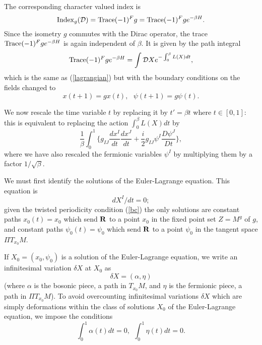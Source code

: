 \documentclass[12pt]{article}
\newcommand{\labell}[1] {\label{#1}}
\begin{document}
The corresponding character valued index is
\begin{equation} \labell{diracg}
{\rm Index}_g (\dbar) = {\rm Trace}  (-1)^Fg  = 
{\rm Trace } (-1)^Fg e^{- \beta H}.
\end{equation}
Since the isometry $g$ commutes with the Dirac operator, the trace 
${\rm Trace } (-1)^Fg e^{- \beta H}$ is again independent of $\beta$.
It  is given by  the path integral 
\begin{equation} \labell{lagrangiang}
{\rm Trace } (-1)^F g e^{- \beta H} = \int \cald X e^{ - \int_{0}^\beta
L(X) dt},
\end{equation}
which is the same as
(\ref{lagrangian}) but with the boundary 
conditions on the fields 
changed to 
\begin{equation} \labell{bc}
x(t+1) = g x(t), ~~~ \psi(t+1) = g \psi(t). 
\end{equation}

We now rescale the time variable $t $  by replacing it by 
$t' = \beta t$ where $t \in [0,1]$:
this is equivalent to replacing
the action $\int_{0}^\beta L(X) dt$ by 
\begin{equation}\labell{resclag}
\frac{1}{\beta}   \int_0^1 \Biggl \{ g_{IJ} \frac{dx^I}{dt} \frac{dx^J}{dt} 
+ \frac{i}{2} g_{IJ}\psi^I \frac{D\psi^J}{Dt}\Biggr \} , 
\end{equation}
where we have also rescaled the fermionic variables $\psi^I$ by
multiplying them by a factor $1/\sqrt{\beta}$.


\newcommand{\bose}{{\alpha } }
\newcommand{\bosep}{ { \bose}^{\parallel} }
\newcommand{\bosen}{ { \bose}^{\perp} }
\newcommand{\etap}{ { \eta}^{\parallel} }
\newcommand{\etan}{ { \eta}^{\perp} }


We must first identify the solutions of the Euler-Lagrange equation.
This equation is 
$$dX^I/dt = 0 ; $$
given the twisted periodicity condition  (\ref{bc}) the only solutions
are constant paths
$x_0(t) = x_0$ which send ${\mathbf{R}} $ to  a point $x_0$ in the fixed point set 
$Z = M^g$ of $g$, and constant paths
$\psi_0(t) = \psi_0 $ which send
${\mathbf{R}}$ to  a point $\psi_0$ in the tangent space $\Pi T_{x_0} M$. 

If $X_0 = (x_0, \psi_0)$ is a solution of the Euler-Lagrange equation,
we write an infinitesimal variation
$\delta X $ at $X_0$ as 
$$ \delta X = (\bose, \eta)$$ 
(where $\bose$ is the bosonic piece, a path in 
$T_{x_0} M$,  and $\eta$ is the fermionic piece, a path in 
$\Pi T_{x_0} M$).
To avoid overcounting
 infinitesimal variations $\delta X$ which are simply deformations
within the class of solutions $X_0$ of the Euler-Lagrange equation, we 
impose the conditions 
\begin{equation} \labell{overcount}
  \int_0^1 \bose(t) dt = 0, ~~\int_0^1 \eta (t) dt = 0.
\end{equation}
\end{document}
